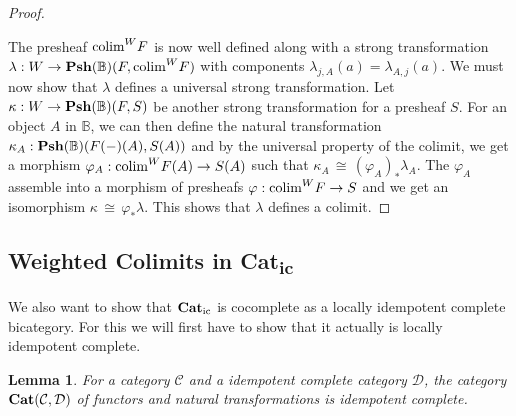 \documentclass[12pt,oneside,reqno,a4paper]{article}
\newtheorem{lemma}[theorem]{Lemma}
\theoremstyle{definition}
\newcommand{\Cat}{\textbf{\textup{Cat}}}
\newcommand{\Catic}{\textbf{\textup{Cat}}_\textup{ic}}
\newcommand{\Psh}[1]{\textbf{\textup{Psh}}(#1)}
\renewcommand{\phi}{\varphi}
\newcommand{\iso}{\,\cong\,}
\newcommand{\C}{\mathcal{C}}
\newcommand{\D}{\mathcal{D}}
\newcommand{\bB}{\mathbb{B}}
\newcommand{\colim}{\textup{colim}}
\begin{document}
\begin{proof}
\begin{center}
\end{center}
The presheaf $\colim^W F$ is now well defined along with a strong transformation $\lambda:W\to \Psh{\bB}(F,\colim^W F)$ with components $\lambda_{j,A}(a)=\lambda_{A,j}(a)$. We must now show that $\lambda$ defines a universal strong transformation. Let $\kappa:W\to \Psh{\bB}(F,S)$ be another strong transformation for a presheaf $S$. For an object $A$ in $\bB$, we can then define the natural transformation $\kappa_A:\Psh{\bB}(F(-)(A),S(A))$ and by the universal property of the colimit, we get a morphism $\phi_A:\colim^W F(A)\to S(A)$ such that $\kappa_A\iso (\phi_A)_*\lambda_A$. The $\phi_A$ assemble into a morphism of presheafs $\phi:\colim^W F\to S$ and we get an isomorphism $\kappa\iso \phi_*\lambda$. This shows that $\lambda$ defines a colimit.
\end{proof}

\subsection{Weighted Colimits in \texorpdfstring{\textbf{Cat}\textsubscript{ic}}{Catic}} \label{app2}

We also want to show that $\Catic$ is cocomplete as a locally idempotent complete bicategory. For this we will first have to show that it actually is locally idempotent complete.

\begin{lemma}
For a category $\C$ and a idempotent complete category $\D$, the category $\Cat(\C,\D)$ of functors and natural transformations is idempotent complete.
\end{lemma}
\end{document}
